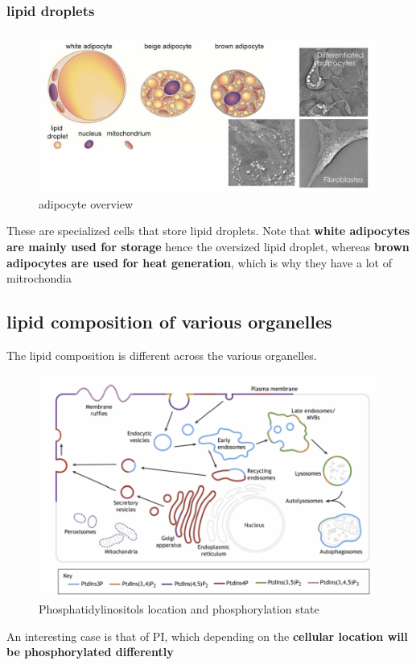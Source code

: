 \documentclass[../main.tex]{subfiles}
\begin{document}
\subsubsection{lipid droplets}
\begin{figure}[H]
    \centering
    \includegraphics[width=0.5\linewidth]{fatCells.png}
    \caption{adipocyte overview}
    \label{fig:enter-label}
\end{figure}

These are specialized cells that store lipid droplets. Note that\textbf{ white adipocytes are mainly used for storage} hence the oversized lipid droplet, whereas \textbf{brown adipocytes are used for heat generation}, which is why they have a lot of mitrochondia

\subsection{lipid composition of various organelles}
The lipid composition is different across the various organelles. 
\begin{figure}[H]
    \centering
    \includegraphics[width=\linewidth]{PI_overview.png}
    \caption{Phosphatidylinositols location and phosphorylation state}
    \label{fig:enter-label}
\end{figure}
An interesting case is that of PI, which depending on the\textbf{ cellular location will be phosphorylated differently}
\end{document}
